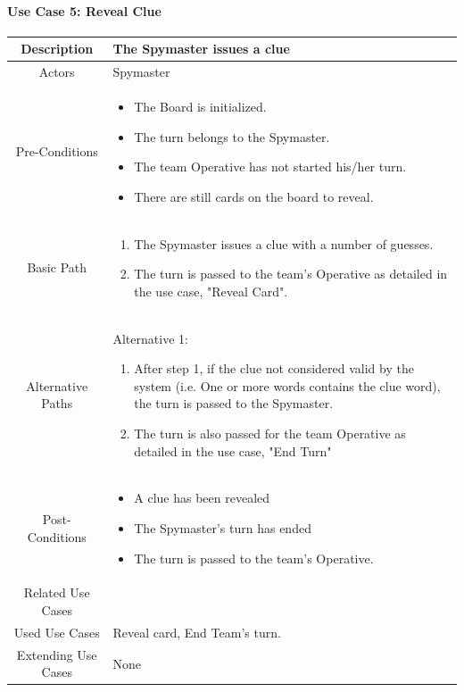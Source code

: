 \documentclass[10pt, a4paper]{article}
\begin{document}
	\paragraph{Use Case 5: Reveal Clue}
	\begin{center}
		\begin{tabular}{ |c|p{10cm}| } 
			\hline
			Description & The Spymaster issues a clue \\ 
			\hline
			Actors & Spymaster \\
			\hline 
			Pre-Conditions & \begin{itemize}[noitemsep,topsep=0pt]
				\item The Board is initialized.
				\item The turn belongs to the Spymaster.
				\item The team Operative has not started his/her turn.
				\item There are still cards on the board to reveal.
			\end{itemize} \\
			\hline
			Basic Path & 
			\begin{enumerate}
				\item The Spymaster issues a clue with a number of guesses.
				\item The turn is passed to the team's Operative as detailed in the use case, "Reveal Card". 
			\end{enumerate} \\
			\hline 
			Alternative Paths & Alternative 1:
			\begin{enumerate}
				\item After step 1, if the clue not considered valid by the system (i.e. One or more words contains the clue word), the turn is passed to the Spymaster.
				\item The turn is also passed for the team Operative as detailed in the use case, "End Turn"
			\end{enumerate}\\
			\hline 
			Post-Conditions & 
			\begin{itemize}[noitemsep,topsep=0pt]
				\item A clue has been revealed
				\item The Spymaster’s turn has ended 
				\item The turn is passed to the team's Operative.
			\end{itemize} \\
			\hline 
			Related Use Cases & \\
			\hline 
			Used Use Cases & Reveal card, End Team's turn. \\
			\hline
			Extending Use Cases & None \\
			\hline
		\end{tabular}
	\end{center}
	
\end{document}
